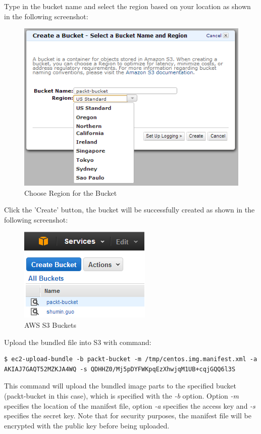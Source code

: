 
Type in the bucket name and select the region based on your location as shown in the following screenshot:
\begin{figure}[h]
  \centering
  \includegraphics[width=.8\textwidth]{figs/5163os_08_18.png}
  \caption{Choose Region for the Bucket}\label{fig:aws.s3.bucket.region}
\end{figure} 

Click the 'Create' button, the bucket will be successfully created as shown in the following screenshot:

\begin{figure}[h]
  \centering
  \includegraphics[width=.50\textwidth]{figs/5163os_08_19.png}
  \caption{AWS S3 Buckets}\label{fig:aws.s3.buckets}
\end{figure} 

Upload the bundled file into S3 with command:
\lstset{style=bashstyle}
\begin{lstlisting}
$ ec2-upload-bundle -b packt-bucket -m /tmp/centos.img.manifest.xml -a AKIAJ7GAQT52MZKJA4WQ -s QDHHZ0/Mj5pDYFWKpqEzXhwjqM1UB+cqjGQQ6l3S
\end{lstlisting}

This command will upload the bundled image parts to the specified bucket (packt-bucket in this case), which is specified with the \emph{-b} option. Option \emph{-m} specifies the location of the manifest file, option \emph{-a} specifies the access key and \emph{-s} specifies the secret key. Note that for security purposes, the manifest file will be encrypted with the public key before being uploaded.

